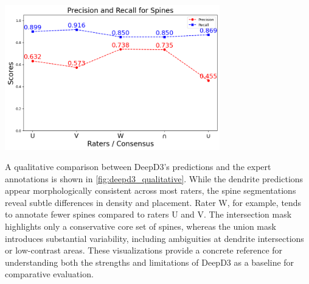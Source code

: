 \begin{center}
\includegraphics[width=0.7\textwidth]{figures/22_deepd3_prec_recall.png}
\label{fig:deepd3_prec_recall}
\end{center}

A qualitative comparison between \gls{DeepD3}'s predictions and the expert annotations is shown in \autoref{fig:deepd3_qualitative}. While the dendrite predictions appear morphologically consistent across most raters, the spine segmentations reveal subtle differences in density and placement. Rater W, for example, tends to annotate fewer spines compared to raters U and V. The intersection mask highlights only a conservative core set of spines, whereas the union mask introduces substantial variability, including ambiguities at dendrite intersections or low-contrast areas. These visualizations provide a concrete reference for understanding both the strengths and limitations of \gls{DeepD3} as a baseline for comparative evaluation.

